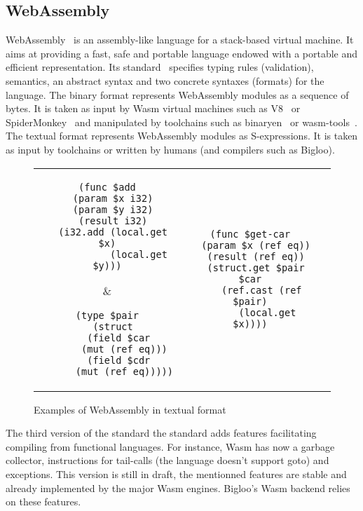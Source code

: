 \documentclass[10pt]{article}
\begin{document}
\subsection{WebAssembly}
WebAssembly~\cite{haas2017bringing} is an assembly-like language for a
stack-based virtual machine. It aims at providing a fast, safe and portable
language endowed with a portable and efficient representation. Its
standard~\cite{WebAssemblyCoreSpecification3} specifies typing rules
(validation), semantics, an abstract syntax and two concrete syntaxes (formats)
for the language. The binary format represents WebAssembly modules as a sequence
of bytes. It is taken as input by Wasm virtual machines such as V8~\cite{V8} or
SpiderMonkey~\cite{SpiderMonkey} and manipulated by toolchains such as
binaryen~\cite{Binaryen} or wasm-tools~\cite{WasmTools}. The textual format
represents WebAssembly modules as S-expressions. It is taken as input by
toolchains or written by humans (and compilers such as Bigloo).
\begin{figure}[h]
\centering
\begin{tabular}{c c c}
\begin{minipage}{1.8in}
\begin{verbatim}
(func $add
  (param $x i32)
  (param $y i32)
  (result i32)
  (i32.add (local.get $x)
           (local.get $y)))
\end{verbatim}
\end{minipage}&
\begin{minipage}{1.6in}
\begin{verbatim}
(type $pair
  (struct
    (field $car
      (mut (ref eq)))
    (field $cdr
      (mut (ref eq)))))
\end{verbatim}
\end{minipage}
&\begin{minipage}{1.8in}
\begin{verbatim}
(func $get-car
  (param $x (ref eq))
  (result (ref eq))
  (struct.get $pair $car
    (ref.cast (ref $pair)
      (local.get $x))))
\end{verbatim}
\end{minipage}
\end{tabular}
\caption{Examples of WebAssembly in textual format}
\end{figure}

The third version of the standard the standard adds features facilitating
compiling from functional languages. For instance, Wasm has now a garbage
collector, instructions for tail-calls (the language doesn't support goto) and
exceptions. This version is still in draft, the mentionned features are stable
and already implemented by the major Wasm engines. Bigloo's Wasm backend relies
on these features.
\end{document}
